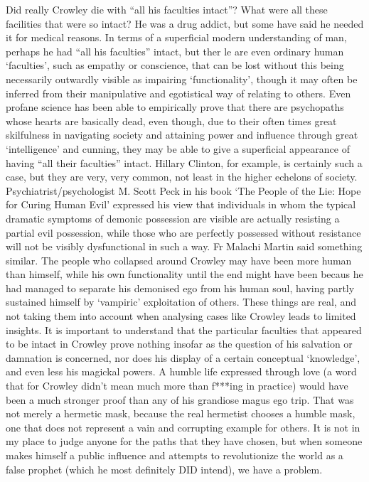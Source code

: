 \begin{footnotesize}
\begin{sffamily}
Did really Crowley die with ``all his faculties intact''? What were all these facilities that were so intact? He was a drug addict, but some have said he needed it for medical reasons. In terms of a superficial modern understanding of man, perhaps he had ``all his faculties'' intact, but ther le are even ordinary human `faculties', such as empathy or conscience, that can be lost without this being necessarily outwardly visible as impairing `functionality', though it may often be inferred from their manipulative and egotistical way of relating to others. Even profane science has been able to empirically prove that there are psychopaths whose hearts are basically dead, even though, due to their often times great skilfulness in navigating society and attaining power and influence through great `intelligence' and cunning, they may be able to give a superficial appearance of having ``all their faculties'' intact. Hillary Clinton, for example, is certainly such a case, but they are very, very common, not least in the higher echelons of society. Psychiatrist/psychologist M. Scott Peck in his book `The People of the Lie: Hope for Curing Human Evil' expressed his view that individuals in whom the typical dramatic symptoms of demonic possession are visible are actually resisting a partial evil possession, while those who are perfectly possessed without resistance will not be visibly dysfunctional in such a way. Fr Malachi Martin said something similar. The people who collapsed around Crowley may have been more human than himself, while his own functionality until the end might have been becaus he had managed to separate his demonised ego from his human soul, having partly sustained himself by `vampiric' exploitation of others. These things are real, and not taking them into account when analysing cases like Crowley leads to limited insights. It is important to understand that the particular faculties that appeared to be intact in Crowley prove nothing insofar as the question of his salvation or damnation is concerned, nor does his display of a certain conceptual `knowledge', and even less his magickal powers. A humble life expressed through love (a word that for Crowley didn't mean much more than f***ing in practice) would have been a much stronger proof than any of his grandiose magus ego trip. That was not merely a hermetic mask, because the real hermetist chooses a humble mask, one that does not represent a vain and corrupting example for others. It is not in my place to judge anyone for the paths that they have chosen, but when someone makes himself a public influence and attempts to revolutionize the world as a false prophet (which he most definitely DID intend), we have a problem.


\end{sffamily}
\end{footnotesize}
